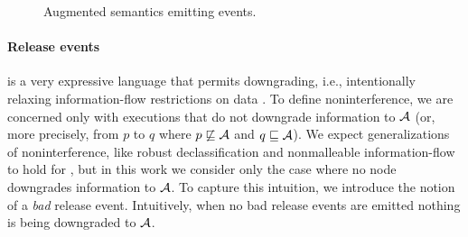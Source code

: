 \begin{figure}
\centering
{}
\caption{Augmented semantics emitting events.}
\label{fig:event-semantics}
\end{figure}

\paragraph{Release events}\label{sec:release-events}
\lang{} is a very expressive language that permits downgrading, i.e., intentionally relaxing information-flow restrictions on data \cite{Myers:1999:JPM:292540.292561}. To define noninterference, we are concerned only with executions that do not downgrade information to $\mathcal{A}$ (or, more precisely, from $p$ to $q$ where $p \not\sqsubseteq \mathcal{A}$ and $q \sqsubseteq \mathcal{A}$).
We expect generalizations of noninterference, like robust declassification \cite{Zdancewic:2001:RD:872752.873524, Myers:2004:ERD:1009380.1009673} and nonmalleable information-flow \cite{Cecchetti:2017:NIF:3133956.3134054} to hold for \lang, but in this work we consider only the case where no node downgrades information to $\mathcal{A}$. To capture this intuition, we introduce the notion of a \emph{bad} release event. Intuitively, when no bad release events are emitted nothing is being downgraded to $\mathcal{A}$.

